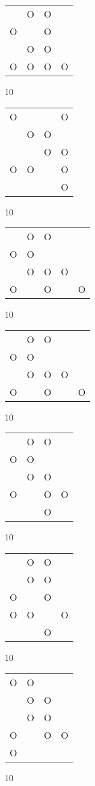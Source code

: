 \begin{tabular}{|m{0.2cm}m{0.2cm}m{0.2cm}m{0.2cm}|}\hline
 &O&O& \\
O& &O& \\
 &O&O& \\
O&O&O&O\\
\hline\end{tabular}10
\begin{tabular}{|m{0.2cm}m{0.2cm}m{0.2cm}m{0.2cm}|}\hline
O& & &O\\
 &O&O& \\
 & &O&O\\
O&O& &O\\
 & & &O\\
\hline\end{tabular}10
\begin{tabular}{|m{0.2cm}m{0.2cm}m{0.2cm}m{0.2cm}m{0.2cm}|}\hline
 &O&O& & \\
O&O& & & \\
 &O&O&O& \\
O& &O& &O\\
\hline\end{tabular}10
\begin{tabular}{|m{0.2cm}m{0.2cm}m{0.2cm}m{0.2cm}m{0.2cm}|}\hline
 &O&O& & \\
O&O& & & \\
 &O&O&O& \\
O& &O& &O\\
\hline\end{tabular}10
\begin{tabular}{|m{0.2cm}m{0.2cm}m{0.2cm}m{0.2cm}|}\hline
 &O&O& \\
O&O& & \\
 &O&O& \\
O& &O&O\\
 & &O& \\
\hline\end{tabular}10
\begin{tabular}{|m{0.2cm}m{0.2cm}m{0.2cm}m{0.2cm}|}\hline
 &O&O& \\
 &O&O& \\
O& &O& \\
O&O& &O\\
 & &O& \\
\hline\end{tabular}10
\begin{tabular}{|m{0.2cm}m{0.2cm}m{0.2cm}m{0.2cm}|}\hline
O&O& & \\
 &O&O& \\
 &O&O& \\
O& &O&O\\
O& & & \\
\hline\end{tabular}10
